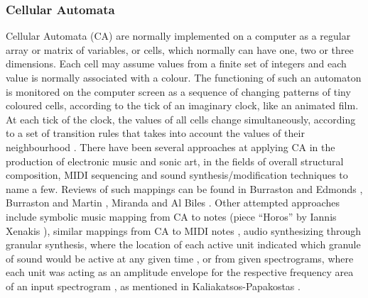         \subsubsection{Cellular Automata} \label{subsub:ca}
        Cellular Automata (CA) are normally implemented on a computer as a regular array or matrix of variables, or cells, which normally can have one, two or three dimensions. Each cell may assume values from a finite set of integers and each value is normally associated with a colour. The functioning of such an automaton is monitored on the computer screen as a sequence of changing patterns of tiny coloured cells, according to the tick of an imaginary clock, like an animated film. At each tick of the clock, the values of all cells change simultaneously, according to a set of transition rules that takes into account the values of their neighbourhood \cite{miranda2001evolving}.   
        There have been several approaches at applying CA in the production of electronic music and sonic art, in the fields of overall structural composition, MIDI sequencing and sound synthesis/modification techniques to name a few. Reviews of such mappings can be found in Burraston and Edmonds \cite{burraston2005cellular}, Burraston and Martin \cite{burraston2006digital}, Miranda and Al Biles \cite{miranda2007evolutionary}. Other attempted approaches include symbolic music mapping from CA to notes (piece ``Horos'' by Iannis Xenakis \cite{solomos2005cellular}), similar mappings from CA to MIDI notes \cite{millen2004interactive}, audio synthesizing through granular synthesis, where the location of each active unit indicated which granule of sound would be active at any given time \cite{miranda2001evolving}, or from given spectrograms, where each unit was acting as an amplitude envelope for the respective frequency area of an input spectrogram \cite{serquera2010evolutionary}, as mentioned in Kaliakatsos-Papakostas \cite{maxim_kal_pap_book}.

